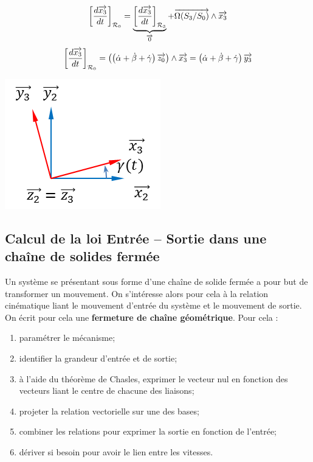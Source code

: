 \documentclass[11pt,oneside]{article}
\begin{document}
\begin{exemple}
\begin{minipage}[c]{.65\linewidth}
$$
\left[\dfrac{d\overrightarrow{x_3}}{dt}\right]_{\mathcal{R}_0} = 
\underbrace{\left[\dfrac{d\overrightarrow{x_3}}{dt}\right]_{\mathcal{R}_3}}_{\overrightarrow{0}}
+ \overrightarrow{\Omega(S_3/S_0)} \wedge \overrightarrow{x_3}
$$
$$
\left[\dfrac{d\overrightarrow{x_3}}{dt}\right]_{\mathcal{R}_0} 
= \left(\left( \dot{\alpha} + \dot{\beta} + \dot{\gamma} \right)\overrightarrow{z_0} \right) \wedge \overrightarrow{x_3}
= \left( \dot{\alpha} + \dot{\beta} + \dot{\gamma} \right)\overrightarrow{y_3}
$$
\end{minipage}\hfill
\begin{minipage}[c]{.35\linewidth}
\includegraphics[width=.9\textwidth]{png/gamma}
\end{minipage}
\vspace{0.5cm}
\end{exemple}

\subsection{Calcul de la loi Entrée -- Sortie dans une chaîne de solides fermée}
\begin{methode}
Un système se présentant sous forme d'une chaîne de solide fermée a pour but de transformer un mouvement. On s'intéresse alors pour cela à la relation cinématique liant le mouvement d'entrée du système et le mouvement de sortie. On écrit pour cela une \textbf{fermeture de chaîne géométrique}. Pour cela :
\begin{enumerate}
\item paramétrer le mécanisme;
\item identifier la grandeur d'entrée et de sortie;
\item à l'aide du théorème de Chasles, exprimer le vecteur nul en fonction des vecteurs liant le centre de chacune des liaisons;
\item projeter la relation vectorielle sur une des bases;
\item combiner les relations pour exprimer la sortie en fonction de l'entrée;
\item dériver si besoin pour avoir le lien entre les vitesses. 
\end{enumerate}
\end{methode}
\end{document}

